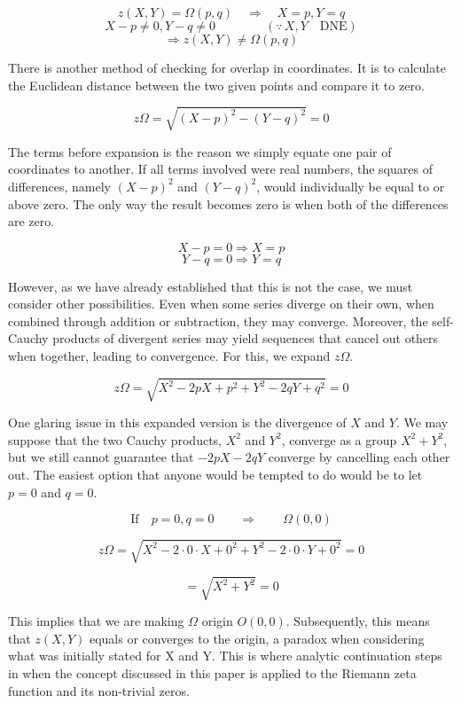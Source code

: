 \documentclass{amsart}
\begin{document}
	\[ z(X,Y) = \Omega(p,q) \quad \Rightarrow \quad X=p, Y=q \]
	\[ X-p \neq 0, Y -q \neq 0 \qquad\qquad (\because \, X, Y \quad \text{DNE}) \]
	\[ \Rightarrow z(X,Y) \neq \Omega(p,q) \]
	
	There is another method of checking for overlap in coordinates. It is to calculate the Euclidean distance between the two given points and compare it to zero.
	
	\[ z\Omega = \sqrt{(X-p)^2 - (Y-q)^2} = 0 \]
	
	The terms before expansion is the reason we simply equate one pair of coordinates to another. If all terms involved were real numbers, the squares of differences, namely $(X-p)^2$ and $(Y-q)^2$, would individually be equal to or above zero. The only way the result becomes zero is when both of the differences are zero.
	
	\[ X-p=0 \Rightarrow X=p  \]
	\[ Y-q=0 \Rightarrow Y=q  \]
	
	However, as we have already established that this is not the case, we must consider other possibilities. Even when some series diverge on their own, when combined through addition or subtraction, they may converge. Moreover, the self-Cauchy products of divergent series may yield sequences that cancel out others when together, leading to convergence. For this, we expand $z\Omega$.
	
	\[ z\Omega = \sqrt{X^2 - 2pX + p^2 + Y^2 - 2qY + q^2} = 0 \]
	
	One glaring issue in this expanded version is the divergence of $X$ and $Y$. We may suppose that the two Cauchy products, $X^2$ and $Y^2$, converge as a group $X^2+Y^2$, but we still cannot guarantee that $-2pX-2qY$ converge by cancelling each other out. The easiest option that anyone would be tempted to do would be to let $p=0$ and $q=0$.
	
	\[ \text{If} \quad p=0, q=0 \qquad \Rightarrow \qquad \Omega(0,0) \]
	
	\[ z\Omega = \sqrt{X^2 - 2 \cdot 0 \cdot X + 0^2 + Y^2 - 2 \cdot 0 \cdot Y + 0^2} = 0 \]
	
	\[ = \sqrt{X^2 + Y^2} = 0 \]
	
	This implies that we are making $\Omega$ origin $O(0,0)$. Subsequently, this means that $z(X,Y)$ equals or converges to the origin, a paradox when considering what was initially stated for X and Y. This is where analytic continuation steps in when the concept discussed in this paper is applied to the Riemann zeta function and its non-trivial zeros.
	
\end{document}
